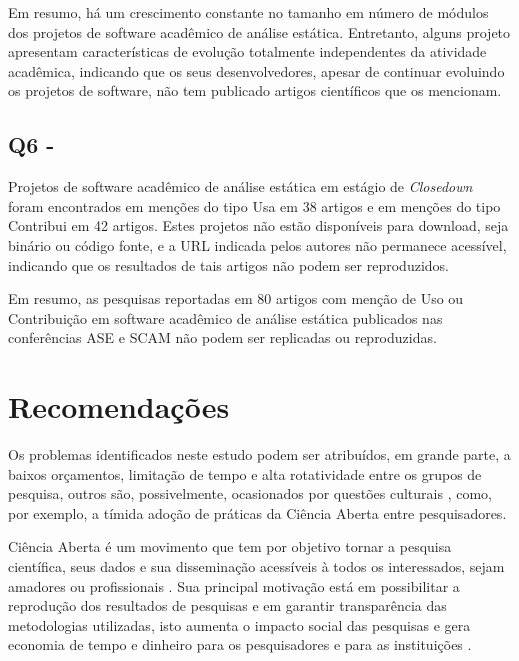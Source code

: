 Em resumo, há um crescimento constante no tamanho em número de módulos dos
projetos de software acadêmico de análise estática.
Entretanto, alguns projeto apresentam características de evolução 
totalmente independentes da atividade acadêmica, 
indicando que os seus desenvolvedores, 
apesar de continuar evoluindo os projetos de software,
não tem publicado artigos científicos que os mencionam.

\subsection{Q6 - \QuestaoSeis}

Projetos de software acadêmico de análise estática em estágio de {\it Closedown} 
foram encontrados em menções do tipo Usa em 38 artigos 
e em menções do tipo Contribui em 42 artigos.
Estes projetos não estão disponíveis para download, seja binário ou código fonte, 
e a URL indicada pelos autores não permanece acessível, 
indicando que os resultados de tais artigos não podem ser reproduzidos.

Em resumo, as pesquisas reportadas em 80 artigos com menção de Uso ou Contribuição em 
software acadêmico de análise estática publicados nas conferências ASE e SCAM 
não podem ser replicadas ou reproduzidas.




\section{Recomendações}
\label{sec:recomendacoes}

Os problemas identificados neste estudo podem ser atribuídos, em grande parte,
a baixos orçamentos, limitação de tempo e alta rotatividade entre os
grupos de pesquisa, outros são, possivelmente, ocasionados por questões
culturais \cite{niemeyer2017open}, como, por exemplo, a tímida adoção de
práticas da Ciência Aberta entre pesquisadores.

Ciência Aberta é um movimento que tem por objetivo tornar a pesquisa
científica, seus dados e sua disseminação acessíveis à todos os interessados,
sejam amadores ou profissionais \cite{WikipediaOpenScience}. Sua principal
motivação está em possibilitar a reprodução dos resultados de pesquisas e em
garantir transparência das metodologias utilizadas, isto aumenta o impacto
social das pesquisas e gera economia de tempo e dinheiro para os pesquisadores
e para as instituições \cite{nesta2010open}.

